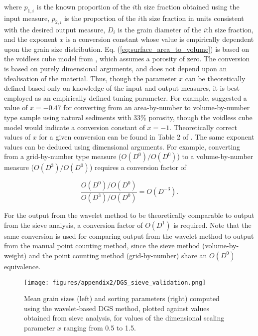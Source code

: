 \documentclass[preprint,12pt,authoryear]{elsarticle}
\begin{document}
\noindent where $p_{1,i}$ is the known proportion of the $i$th size fraction obtained using the input measure, $p_{2,i}$ is the proportion of the $i$th size fraction in units consistent with the desired output measure, $D_i$ is the grain diameter of the $i$th size fraction, and the exponent $x$ is a conversion constant whose value is empirically dependent upon the grain size distribution. Eq. (\ref{eq:surface_area_to_volume}) is based on the voidless cube model from \citet{Kellerhals_Bray1971}, which assumes a porosity of zero. The \citeauthor{Kellerhals_Bray1971} conversion is based on purely dimensional arguments, and does not depend upon an idealisation of the material. Thus, though the parameter $x$ can be theoretically defined based only on knowledge of the input and output measures, it is best employed as an empirically defined tuning parameter. For example, \citet{Diplas_Sutherland1988} suggested a value of $x=-0.47$ for converting from an area-by-number to volume-by-number type sample using natural sediments with 33\% porosity, though the voidless cube model would indicate a conversion constant of $x=-1$. Theoretically correct values of $x$ for a given conversion can be found in Table 2 of \citet{Kellerhals_Bray1971}. The same exponent values can be deduced using dimensional arguments. For example, converting from a grid-by-number type measure ($O(D^0)/O(D^0)$) to a volume-by-number measure ($O(D^3)/O(D^0)$) requires a conversion factor of 

\begin{equation}\label{eq:order_balance}
\frac{O(D^0)/O(D^0)}{O(D^3)/O(D^0)} = O(D^{-3}).
\end{equation} 

For the output from the wavelet method to be theoretically comparable to output from the sieve analysis, a conversion factor of $O(D^1)$ is required. Note that the same conversion is used for comparing output from the wavelet method to output from the manual point counting method, since the sieve method (volume-by-weight) and the point counting method (grid-by-number) share an $O(D^0)$ equivalence. 

\begin{figure}
	\texttt{[image: figures/appendix2/DGS\_sieve\_validation.png]}
	\caption[Mean grain size and sorting: wavelet method versus sieve]{Mean grain sizes (left) and sorting parameters (right) computed using the wavelet-based DGS method, plotted against values obtained from sieve analysis, for values of the dimensional scaling parameter $x$ ranging from 0.5 to 1.5. \label{fig:validation_sieve}}
\end{figure}
\end{document}
